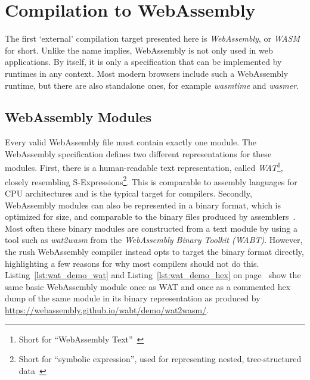 \section{Compilation to WebAssembly}\label{sec:wasm}

The first `external' compilation target presented here is \emph{WebAssembly}, or \emph{WASM} for short.
Unlike the name implies, WebAssembly is not only used in web applications.
By itself, it is only a specification that can be implemented by runtimes in any context.
Most modern browsers include such a WebAssembly runtime, but there are also standalone ones, for example \emph{wasmtime} and \emph{wasmer}.

\subsection{WebAssembly Modules}

Every valid WebAssembly file must contain exactly one module.
The WebAssembly specification defines two different representations for these modules.
First, there is a human-readable text representation, called \emph{WAT}\footnote{Short for \enquote{WebAssembly Text}~\cite[p.~40]{Sendil2022-fy}}, closely resembling S-Expressions\footnote{Short for \enquote{symbolic expression}, used for representing  nested, tree-structured data~\cite[p.~41]{Sendil2022-fy}}.
This is comparable to assembly languages for CPU architectures and is the typical target for compilers.
Secondly, WebAssembly modules can also be represented in a binary format, which is optimized for size, and comparable to the binary files produced by assemblers~\cite[pp.~40--44]{Sendil2022-fy}.
Most often these binary modules are constructed from a text module by using a tool such as \emph{wat2wasm} from the \emph{WebAssembly Binary Toolkit (WABT)}.
However, the rush WebAssembly compiler instead opts to target the binary format directly, highlighting a few reasons for why most compilers should not do this.
Listing~\ref{lst:wat_demo_wat} and Listing~\ref{lst:wat_demo_hex} on page~\pageref{lst:wat_demo_wat} show the same basic WebAssembly module once as WAT and once as a commented hex dump of the same module in its binary representation as produced by \url{https://webassembly.github.io/wabt/demo/wat2wasm/}.


